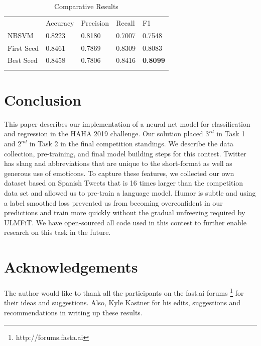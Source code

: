 \documentclass[runningheads]{llncs}
\begin{document}
\begin{table}[ht]
	\caption{Comparative Results}
	\label{tab:tab_results}
	\begin{tabular}{lllll}
		\hline\noalign{\smallskip}
		 & Accuracy & Precision & Recall & F1 \\
		\noalign{\smallskip}\hline\noalign{\smallskip}
NBSVM &      0.8223 & 0.8180 & 0.7007 & 0.7548 \\
First Seed & 0.8461 & 0.7869 & 0.8309 & 0.8083 \\
Best Seed &  0.8458 & 0.7806 & 0.8416 & \textbf{0.8099} \\
		\noalign{\smallskip}\hline
	\end{tabular}
\end{table}

\section{Conclusion}
\label{sec:5}
This paper describes our implementation of a neural net model for classification and regression in the HAHA 2019 challenge.  Our solution placed $3^{rd}$ in Task 1 and $2^{nd}$ in Task 2 in the final competition standings.  We describe the data collection, pre-training, and final model building steps for this contest.  Twitter has slang and abbreviations that are unique to the short-format as well as generous use of emoticons.  To capture these features, we collected our own dataset based on Spanish Tweets that is 16 times larger than the competition data set and allowed us to pre-train a language model.  Humor is subtle and using a label smoothed loss prevented us from becoming overconfident in our predictions and train more quickly without the gradual unfreezing required by ULMFiT. We have open-sourced all  code used in this contest to further enable research on this task in the future.

\section{Acknowledgements}
The author would like to thank all the participants on the fast.ai forums \footnote{http://forums.fasta.ai} for their ideas and suggestions. Also, Kyle Kastner for his edits, suggestions and recommendations in writing up these results. 


\end{document}
